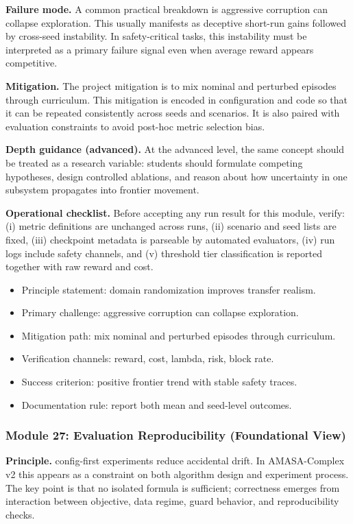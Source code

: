 \documentclass[conference]{IEEEtran}
\begin{document}
\textbf{Failure mode.} A common practical breakdown is aggressive corruption can collapse exploration. This usually manifests as deceptive short-run gains followed by cross-seed instability. In safety-critical tasks, this instability must be interpreted as a primary failure signal even when average reward appears competitive.

\textbf{Mitigation.} The project mitigation is to mix nominal and perturbed episodes through curriculum. This mitigation is encoded in configuration and code so that it can be repeated consistently across seeds and scenarios. It is also paired with evaluation constraints to avoid post-hoc metric selection bias.

\textbf{Depth guidance (advanced).} At the advanced level, the same concept should be treated as a research variable: students should formulate competing hypotheses, design controlled ablations, and reason about how uncertainty in one subsystem propagates into frontier movement.

\textbf{Operational checklist.} Before accepting any run result for this module, verify: (i) metric definitions are unchanged across runs, (ii) scenario and seed lists are fixed, (iii) checkpoint metadata is parseable by automated evaluators, (iv) run logs include safety channels, and (v) threshold tier classification is reported together with raw reward and cost.

\begin{itemize}[leftmargin=*]
  \item Principle statement: domain randomization improves transfer realism.
  \item Primary challenge: aggressive corruption can collapse exploration.
  \item Mitigation path: mix nominal and perturbed episodes through curriculum.
  \item Verification channels: reward, cost, lambda, risk, block rate.
  \item Success criterion: positive frontier trend with stable safety traces.
  \item Documentation rule: report both mean and seed-level outcomes.
\end{itemize}


\subsubsection{Module 27: Evaluation Reproducibility (Foundational View)}
\textbf{Principle.} config-first experiments reduce accidental drift. In AMASA-Complex v2 this appears as a constraint on both algorithm design and experiment process. The key point is that no isolated formula is sufficient; correctness emerges from interaction between objective, data regime, guard behavior, and reproducibility checks.
\end{document}
